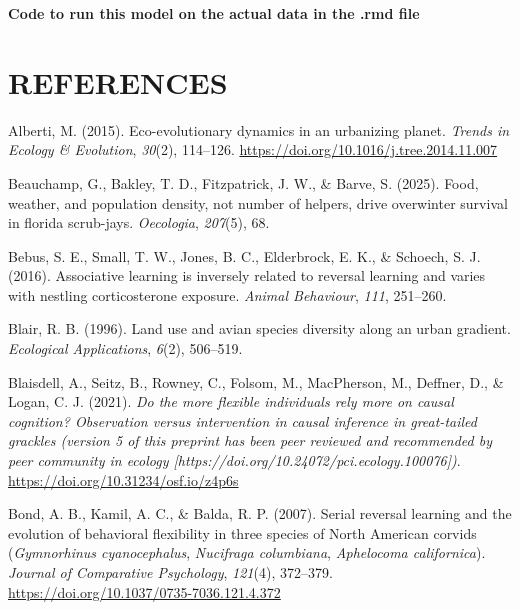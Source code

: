 \documentclass[
]{article}
\newlength{\cslhangindent}
\newenvironment{CSLReferences}[2] %
 {\begin{list}{}{%
  \setlength{\itemindent}{0pt}
  \setlength{\leftmargin}{0pt}
  \setlength{\parsep}{0pt}
  \ifodd #1
   \setlength{\leftmargin}{\cslhangindent}
   \setlength{\itemindent}{-1\cslhangindent}
  \fi
  \setlength{\itemsep}{#2\baselineskip}}}
 {\end{list}}
\begin{document}
\textbf{Code to run this model on the actual data in the .rmd file}

\section*{\texorpdfstring{\textbf{REFERENCES}}{REFERENCES}}\label{references}

\protect{}\label{refs}
\begin{CSLReferences}{1}{0}
Alberti, M. (2015). Eco-evolutionary dynamics in an urbanizing planet.
\emph{Trends in Ecology \& Evolution}, \emph{30}(2), 114--126.
\url{https://doi.org/10.1016/j.tree.2014.11.007}

Beauchamp, G., Bakley, T. D., Fitzpatrick, J. W., \& Barve, S. (2025).
Food, weather, and population density, not number of helpers, drive
overwinter survival in florida scrub-jays. \emph{Oecologia},
\emph{207}(5), 68.

Bebus, S. E., Small, T. W., Jones, B. C., Elderbrock, E. K., \& Schoech,
S. J. (2016). Associative learning is inversely related to reversal
learning and varies with nestling corticosterone exposure. \emph{Animal
Behaviour}, \emph{111}, 251--260.

Blair, R. B. (1996). Land use and avian species diversity along an urban
gradient. \emph{Ecological Applications}, \emph{6}(2), 506--519.

Blaisdell, A., Seitz, B., Rowney, C., Folsom, M., MacPherson, M.,
Deffner, D., \& Logan, C. J. (2021). \emph{Do the more flexible
individuals rely more on causal cognition? Observation versus
intervention in causal inference in great-tailed grackles (version 5 of
this preprint has been peer reviewed and recommended by peer community
in ecology {[}https://doi.org/10.24072/pci.ecology.100076{]})}.
\url{https://doi.org/10.31234/osf.io/z4p6s}

Bond, A. B., Kamil, A. C., \& Balda, R. P. (2007). Serial reversal
learning and the evolution of behavioral flexibility in three species of
{North} {American} corvids (\emph{{Gymnorhinus} cyanocephalus},
\emph{{Nucifraga} columbiana}, \emph{{Aphelocoma} californica}).
\emph{Journal of Comparative Psychology}, \emph{121}(4), 372--379.
\url{https://doi.org/10.1037/0735-7036.121.4.372}


\end{CSLReferences}
\end{document}
